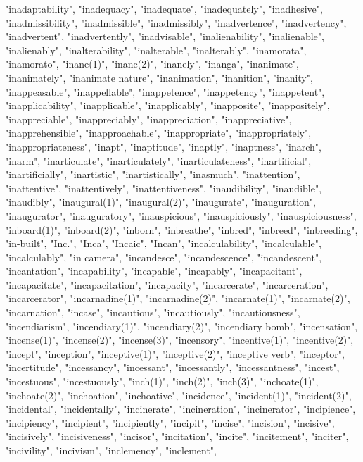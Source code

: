 "inadaptability",
"inadequacy",
"inadequate",
"inadequately",
"inadhesive",
"inadmissibility",
"inadmissible",
"inadmissibly",
"inadvertence",
"inadvertency",
"inadvertent",
"inadvertently",
"inadvisable",
"inalienability",
"inalienable",
"inalienably",
"inalterability",
"inalterable",
"inalterably",
"inamorata",
"inamorato",
"inane(1)",
"inane(2)",
"inanely",
"inanga",
"inanimate",
"inanimately",
"inanimate nature",
"inanimation",
"inanition",
"inanity",
"inappeasable",
"inappellable",
"inappetence",
"inappetency",
"inappetent",
"inapplicability",
"inapplicable",
"inapplicably",
"inapposite",
"inappositely",
"inappreciable",
"inappreciably",
"inappreciation",
"inappreciative",
"inapprehensible",
"inapproachable",
"inappropriate",
"inappropriately",
"inappropriateness",
"inapt",
"inaptitude",
"inaptly",
"inaptness",
"inarch",
"inarm",
"inarticulate",
"inarticulately",
"inarticulateness",
"inartificial",
"inartificially",
"inartistic",
"inartistically",
"inasmuch",
"inattention",
"inattentive",
"inattentively",
"inattentiveness",
"inaudibility",
"inaudible",
"inaudibly",
"inaugural(1)",
"inaugural(2)",
"inaugurate",
"inauguration",
"inaugurator",
"inauguratory",
"inauspicious",
"inauspiciously",
"inauspiciousness",
"inboard(1)",
"inboard(2)",
"inborn",
"inbreathe",
"inbred",
"inbreed",
"inbreeding",
"in-built",
"Inc.",
"Inca",
"Incaic",
"Incan",
"incalculability",
"incalculable",
"incalculably",
"in camera",
"incandesce",
"incandescence",
"incandescent",
"incantation",
"incapability",
"incapable",
"incapably",
"incapacitant",
"incapacitate",
"incapacitation",
"incapacity",
"incarcerate",
"incarceration",
"incarcerator",
"incarnadine(1)",
"incarnadine(2)",
"incarnate(1)",
"incarnate(2)",
"incarnation",
"incase",
"incautious",
"incautiously",
"incautiousness",
"incendiarism",
"incendiary(1)",
"incendiary(2)",
"incendiary bomb",
"incensation",
"incense(1)",
"incense(2)",
"incense(3)",
"incensory",
"incentive(1)",
"incentive(2)",
"incept",
"inception",
"inceptive(1)",
"inceptive(2)",
"inceptive verb",
"inceptor",
"incertitude",
"incessancy",
"incessant",
"incessantly",
"incessantness",
"incest",
"incestuous",
"incestuously",
"inch(1)",
"inch(2)",
"inch(3)",
"inchoate(1)",
"inchoate(2)",
"inchoation",
"inchoative",
"incidence",
"incident(1)",
"incident(2)",
"incidental",
"incidentally",
"incinerate",
"incineration",
"incinerator",
"incipience",
"incipiency",
"incipient",
"incipiently",
"incipit",
"incise",
"incision",
"incisive",
"incisively",
"incisiveness",
"incisor",
"incitation",
"incite",
"incitement",
"inciter",
"incivility",
"incivism",
"inclemency",
"inclement",
